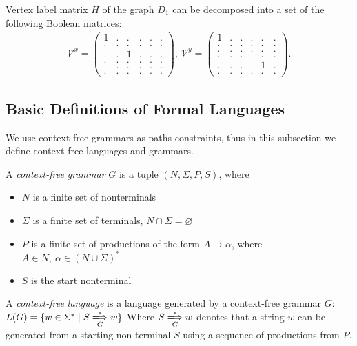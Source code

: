 Vertex label matrix $H$ of the graph $D_1$ can be decomposed into a set of the following Boolean matrices:
{
    \renewcommand{\arraystretch}{0.5}
    \setlength\arraycolsep{1.5pt}
\begin{align*}
\mathcal{V}^x =
\begin{pmatrix}
    1 & . & . & . & . & . \\
    . & . & . & . & . & . \\
    . & . & 1 & . & . & . \\
    . & . & . & . & . & . \\
    . & . & . & . & . & . \\
    . & . & . & . & . & .
\end{pmatrix},~
\mathcal{V}^y =
\begin{pmatrix}
    1 & . & . & . & . & . \\
    . & . & . & . & . & . \\
    . & . & . & . & . & . \\
    . & . & . & . & . & . \\
    . & . & . & . & 1 & . \\
    . & . & . & . & . & .
\end{pmatrix}.
\end{align*}
}

\subsection{Basic Definitions of Formal Languages}
We use context-free grammars as paths constraints, thus in this subsection we define context-free languages and grammars.

\begin{definition}A \emph{context-free grammar} $G$ is a tuple $(N, \Sigma, P, S)$, where
\begin{itemize}
    \item $N$ is a finite set of nonterminals
    \item $\Sigma$ is a finite set of terminals, $N \cap \Sigma = \varnothing$
    \item $P$ is a finite set of productions of the form $A \to \alpha$, where $A \in N,\ \alpha \in (N \cup \Sigma)^*$
    \item $S$ is the start nonterminal
\end{itemize} 
\end{definition}

\begin{definition} A \emph{context-free language} is a language generated by a context-free grammar $G$:
  $   L(G) = \{w \in \Sigma^* \mid S \xLongrightarrow[G]{*} w \}$
Where $S \xLongrightarrow[G]{*} w$  denotes that a string $w$ can be generated from a starting non-terminal $S$ using a sequence of productions from $P$.
\end{definition}

